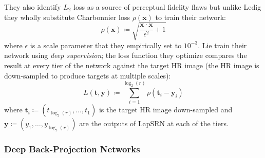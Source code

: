 They also identify \(L_2\) loss as a source of perceptual fidelity flaws but unlike Ledig \etal they wholly substitute Charbonnier loss \cite{charbonnier1994two} \(\rho(\bm{x})\) to train their network:
\begin{equation}
    \rho(\bm{x}) \coloneqq \sqrt{\frac{\bm{x}\cdot \bm{x}}{\epsilon^2}+ 1}
\end{equation}
where \(\epsilon\) is a scale parameter that they empirically set to \(10^{-3}\). 
%
Lie \etal train their network using \textit{deep supervision}; the loss function they optimize compares the result at every tier of the network against the target HR image (the HR image is down-sampled to produce targets at multiple scales):
\begin{equation}
    L(\bm{t}, \bm{y}) \coloneqq \sum_{i=1}^{\log_2(r)} \rho(\bm{t}_i - \bm{y}_i)
\end{equation}
where \(\bm{t}_i \coloneqq (t_{\log_2{(r)}}, \dots, t_1)\) is the target HR image down-sampled and \(\bm{y} \coloneqq (y_1, \dots, y_{\log_2(r)})\) are the outputs of LapSRN at each of the tiers.




\subsubsection{Deep Back-Projection Networks}\label{subsubsec:dbpn}




